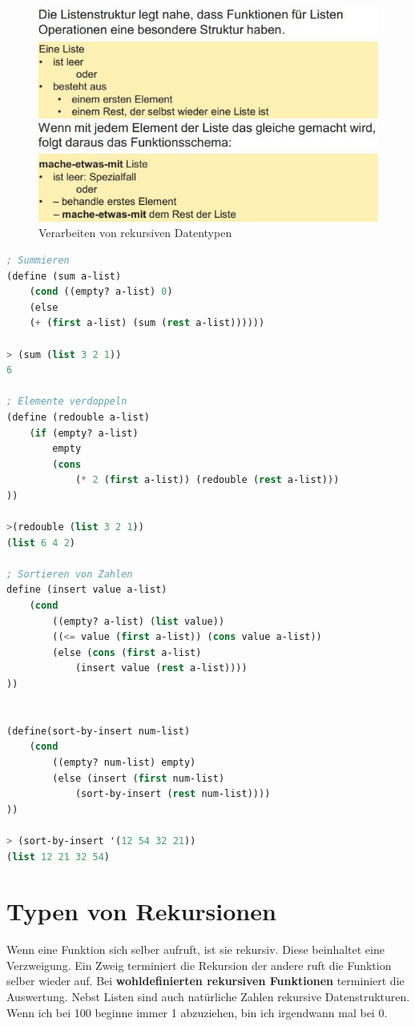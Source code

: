 \begin{figure}[h!]
\centering
\includegraphics[width=0.7\linewidth]{fig/scheme-recursive-function-schema}
\caption{Verarbeiten von rekursiven Datentypen}
\label{fig:scheme-recursive-function-schema}
\end{figure}

\begin{lstlisting}[language=Lisp, caption=Funktionen auf listen]
; Summieren
(define (sum a-list)
	(cond ((empty? a-list) 0)
	(else
	(+ (first a-list) (sum (rest a-list))))))
	
> (sum (list 3 2 1))
6

; Elemente verdoppeln
(define (redouble a-list)
	(if (empty? a-list)
		empty
		(cons
			(* 2 (first a-list)) (redouble (rest a-list)))
))

>(redouble (list 3 2 1))
(list 6 4 2)

; Sortieren von Zahlen
define (insert value a-list)
	(cond
		((empty? a-list) (list value))
		((<= value (first a-list)) (cons value a-list))
		(else (cons (first a-list)
			(insert value (rest a-list))))
))


(define(sort-by-insert num-list)
	(cond
		((empty? num-list) empty)
		(else (insert (first num-list)
			(sort-by-insert (rest num-list))))
))

> (sort-by-insert '(12 54 32 21))
(list 12 21 32 54)
\end{lstlisting}

\section{Typen von Rekursionen}
Wenn eine Funktion sich selber aufruft, ist sie rekursiv. Diese beinhaltet eine Verzweigung. Ein Zweig terminiert die Rekursion der andere ruft die Funktion selber wieder auf. Bei \textbf{wohldefinierten rekursiven Funktionen} terminiert die Auswertung. Nebst Listen sind auch natürliche Zahlen rekursive Datenstrukturen. Wenn ich bei 100 beginne immer 1 abzuziehen, bin ich irgendwann mal bei 0.

